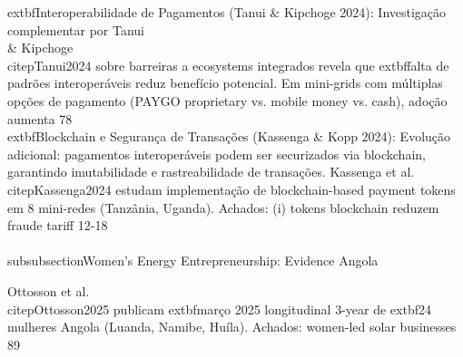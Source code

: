 \documentclass[12pt, a4paper]{article}
\begin{document}
{{{{{{{{{{{	extbf{Interoperabilidade de Pagamentos (Tanui & Kipchoge 2024)}: Investigação complementar por Tanui \\& Kipchoge~\\citep{Tanui2024} sobre barreiras a ecosystems integrados revela que 	extbf{falta de padrões interoperáveis} reduz benefício potencial. Em mini-grids com múltiplas opções de pagamento (PAYGO proprietary vs. mobile money vs. cash), adoção aumenta 78\\%

	extbf{Blockchain e Segurança de Transações (Kassenga & Kopp 2024)}: Evolução adicional: pagamentos interoperáveis podem ser securizados via blockchain, garantindo imutabilidade e rastreabilidade de transações. Kassenga et al.~\\citep{Kassenga2024} estudam implementação de blockchain-based payment tokens em 8 mini-redes (Tanzânia, Uganda). Achados: (i) tokens blockchain reduzem fraude tariff 12-18\\%

\\subsubsection{Women's Energy Entrepreneurship: Evidence Angola}

Ottosson et al.~\\citep{Ottosson2025} publicam 	extbf{março 2025} longitudinal 3-year de 	extbf{24 mulheres Angola (Luanda, Namibe, Huíla)}. Achados: women-led solar businesses 89\\%

}}}}}}}}}}}
\end{document}
